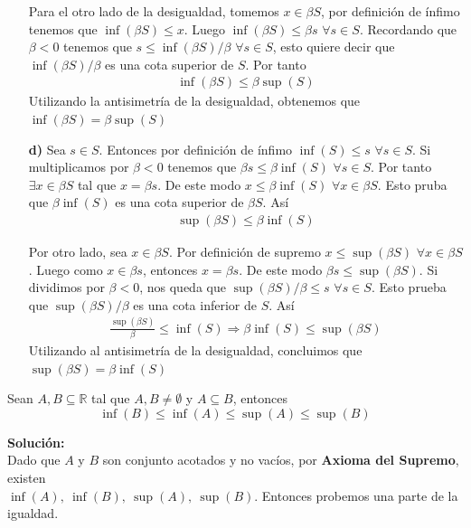 \documentclass[12pt]{book}
\begin{document}
\begin{itemize}
Para el otro lado de la desigualdad, tomemos $x \in \beta S$, por definición de ínfimo tenemos que $\inf(\beta S)\leq x$. Luego $\inf(\beta S) \leq \beta s$ $\forall s \in S$. Recordando que $\beta <0$ tenemos que $s\leq \inf(\beta S) / \beta$ $\forall s \in S$, esto quiere decir que $\inf(\beta S) / \beta$ es una cota superior de $S$. Por tanto 
\begin{align*}
    \inf(\beta S) \leq \beta \sup(S)
\end{align*}
Utilizando la antisimetría de la desigualdad, obtenemos que $\inf(\beta S)=\beta \sup(S)$

\item[\textbf{d)}] Sea $s \in S$. Entonces por definición de ínfimo $\inf(S)\leq s$ $\forall s \in S$. Si multiplicamos por $\beta <0$ tenemos que $\beta s \leq \beta \inf (S)$ $\forall s \in S$. Por tanto $\exists x \in \beta S$ tal que $x=\beta s$. De este modo $x \leq \beta \inf(S)$ $\forall x \in \beta S$. Esto pruba que $\beta \inf(S)$ es una cota superior de $\beta S$. Así
\begin{align*}
    \sup(\beta S)\leq \beta \inf(S)
\end{align*}

Por otro lado, sea $x \in \beta S$. Por definición de supremo $x\leq \sup(\beta S)$ $\forall x \in \beta S$. Luego como $x \in \beta s$, entonces $x=\beta s$. De este modo $\beta s \leq \sup(\beta S)$. Si dividimos por $\beta <0$, nos queda que $\sup(\beta S)/\beta \leq s$ $\forall s \in S$. Esto prueba que $\sup(\beta S)/\beta$ es una cota inferior de $S$. Así
\begin{align*}
    \frac{\sup(\beta S)}{\beta} \leq \inf(S) \Longrightarrow \beta \inf(S) \leq \sup(\beta S)
\end{align*}
Utilizando al antisimetría de la desigualdad, concluimos que $\sup(\beta S)= \beta \inf(S)$

\end{itemize}

\begin{prob}{}{}
 Sean $A,B \subseteq \mathbb{R}$ tal que $A,B\neq \emptyset$ y $A \subseteq B$, entonces
        \begin{equation*}
            \inf(B)\leq \inf(A)\leq \sup(A)\leq \sup(B)
        \end{equation*}
\end{prob}
\textbf{Solución:} \\

Dado que $A$ y $B$ son conjunto acotados y no vacíos, por \textbf{Axioma del Supremo}, existen  \\
 $\inf(A), \ \inf(B), \ \sup(A), \ \sup(B)$. Entonces probemos una parte de la igualdad. \\
\end{document}
